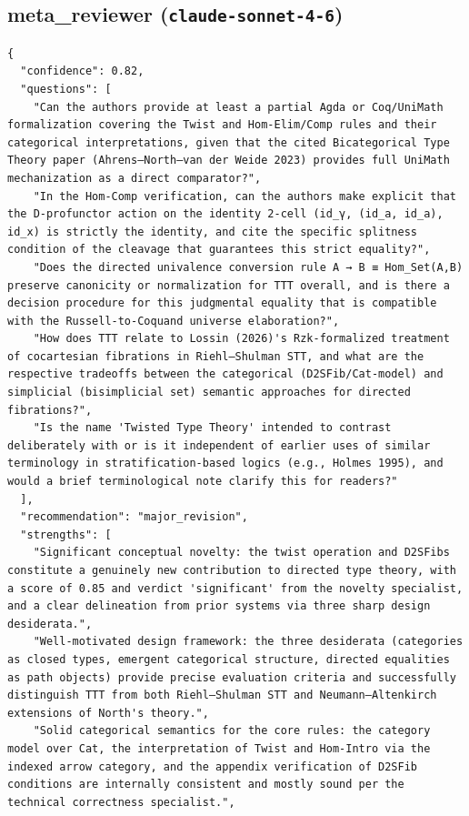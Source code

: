 \documentclass[11pt]{article}
\begin{document}
\subsection*{meta_reviewer (\texttt{claude-sonnet-4-6})}
\begin{verbatim}
{
  "confidence": 0.82,
  "questions": [
    "Can the authors provide at least a partial Agda or Coq/UniMath formalization covering the Twist and Hom-Elim/Comp rules and their categorical interpretations, given that the cited Bicategorical Type Theory paper (Ahrens–North–van der Weide 2023) provides full UniMath mechanization as a direct comparator?",
    "In the Hom-Comp verification, can the authors make explicit that the D-profunctor action on the identity 2-cell (id_γ, (id_a, id_a), id_x) is strictly the identity, and cite the specific splitness condition of the cleavage that guarantees this strict equality?",
    "Does the directed univalence conversion rule A → B ≡ Hom_Set(A,B) preserve canonicity or normalization for TTT overall, and is there a decision procedure for this judgmental equality that is compatible with the Russell-to-Coquand universe elaboration?",
    "How does TTT relate to Lossin (2026)'s Rzk-formalized treatment of cocartesian fibrations in Riehl–Shulman STT, and what are the respective tradeoffs between the categorical (D2SFib/Cat-model) and simplicial (bisimplicial set) semantic approaches for directed fibrations?",
    "Is the name 'Twisted Type Theory' intended to contrast deliberately with or is it independent of earlier uses of similar terminology in stratification-based logics (e.g., Holmes 1995), and would a brief terminological note clarify this for readers?"
  ],
  "recommendation": "major_revision",
  "strengths": [
    "Significant conceptual novelty: the twist operation and D2SFibs constitute a genuinely new contribution to directed type theory, with a score of 0.85 and verdict 'significant' from the novelty specialist, and a clear delineation from prior systems via three sharp design desiderata.",
    "Well-motivated design framework: the three desiderata (categories as closed types, emergent categorical structure, directed equalities as path objects) provide precise evaluation criteria and successfully distinguish TTT from both Riehl–Shulman STT and Neumann–Altenkirch extensions of North's theory.",
    "Solid categorical semantics for the core rules: the category model over Cat, the interpretation of Twist and Hom-Intro via the indexed arrow category, and the appendix verification of D2SFib conditions are internally consistent and mostly sound per the technical correctness specialist.",

\end{verbatim}
\end{document}
